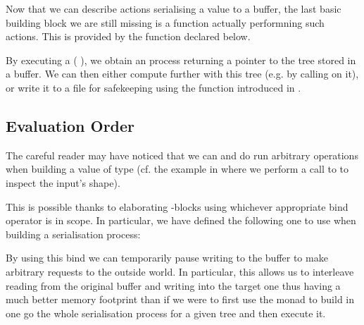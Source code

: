Now that we can describe actions serialising a value to a buffer,
the last basic building block we are still missing is a function actually
performning such actions.
%
This is provided by the  function
declared below.


By executing a (  ), we
obtain an  process returning a pointer to the tree 
stored in a buffer.
%
We can then either compute further with this tree (e.g. by calling
 on it), or write it to a file for safekeeping
using the function 
introduced in .

\subsection{Evaluation Order}

The careful reader may have noticed that we can and do run arbitrary 
operations when building a value of type 
(cf. the  example in  where we perform
a call to  to inspect the input's shape).

This is possible thanks to \idris{} elaborating -blocks using
whichever appropriate bind operator is in scope. In particular, we have defined
the following one to use when building a serialisation process:


By using this bind we can temporarily pause writing to the buffer to make
arbitrary  requests to the outside world.
%
In particular, this allows us to interleave reading from the original buffer
and writing into the target one thus having a much better memory footprint than
if we were to first use the  monad to build in one go the whole
serialisation process for a given tree and then execute it.
